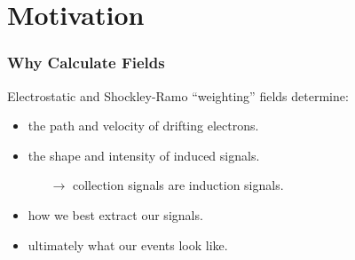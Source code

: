 \documentclass[xcolor=dvipsnames]{beamer}
\begin{document}





\section{Motivation}

\begin{frame}
  \frametitle{Why Calculate Fields}
  Electrostatic and Shockley-Ramo ``weighting'' fields determine:
  \begin{itemize}
  \item the path and velocity of drifting electrons.
  \item the shape and intensity of induced signals.
    \begin{itemize}
    \item[$\rightarrow$] collection signals are induction signals.
    \end{itemize}
  \item how we best extract our signals.
  \item ultimately what our events look like.
  \end{itemize}
\end{frame}
\end{document}
